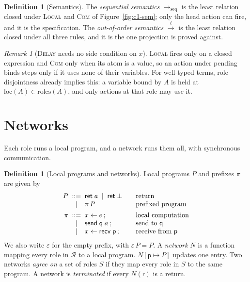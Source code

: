 \documentclass[11pt]{report}
\theoremstyle{plain}
\theoremstyle{definition}
\newtheorem{definition}[theorem]{Definition}
\theoremstyle{remark}
\newtheorem{remark}[theorem]{Remark}
\newcommand{\kw}[1]{\mathsf{#1}}
\newcommand{\pp}{\mathsf{p}}
\newcommand{\qq}{\mathsf{q}}
\newcommand{\rr}{\mathsf{r}}
\newcommand{\Roles}{\mathcal{R}}
\newcommand{\roles}[1]{\mathrm{roles}(#1)}
\newcommand{\loc}[1]{\mathrm{loc}(#1)}
\newcommand{\lto}[1]{\xrightarrow{\;#1\;}}
\newcommand{\seqto}{\to_{\mathrm{seq}}}
\newcommand{\nsend}[2]{\kw{send}\;#1\;#2}
\newcommand{\nrecv}[1]{\kw{recv}\;#1}
\newcommand{\upd}[3]{#1[#2 \mapsto #3]}
\newcommand{\rn}[1]{{\normalfont\scshape #1}}
\begin{document}
\begin{definition}[Semantics]\label{def:c1-sem}
  The \emph{sequential semantics} $\seqto$ is the least relation closed under
  \rn{Local} and \rn{Com} of Figure~\ref{fig:c1-sem}; only the head action can
  fire, and it is the specification.  The \emph{out-of-order semantics}
  $\lto{\ell}$ is the least relation closed under all three rules, and it is
  the one projection is proved against.
\end{definition}

\begin{remark}[\rn{Delay} needs no side condition on $x$]\label{rem:c1-delay}
  \rn{Local} fires only on a closed expression and \rn{Com} only when its atom
  is a value, so an action under pending binds steps only if it uses none of
  their variables.  For well-typed terms, role disjointness already implies
  this: a variable bound by $A$ is held at $\loc{A}\in\roles{A}$, and only
  actions at that role may use it.
\end{remark}

\section{Networks}
\label{sec:c1-net}

Each role runs a local program, and a network runs them all, with synchronous
communication.

\begin{definition}[Local programs and networks]\label{def:c1-net}
  Local programs $P$ and prefixes $\pi$ are given by
  \[
  \begin{array}{r@{\;\;}c@{\;\;}l@{\qquad}l}
    P & ::= & \kw{ret}\;a \;\mid\; \kw{ret}\;\bot & \text{return}\\
      & \mid & \pi\,P & \text{prefixed program}\\[1ex]
    \pi & ::= & x\leftarrow e\,; & \text{local computation}\\
      & \mid & \nsend{\qq}{a}\,; & \text{send to } \qq\\
      & \mid & x\leftarrow\nrecv{\pp}\,; & \text{receive from } \pp
  \end{array}
  \]
  We also write $\varepsilon$ for the empty prefix, with $\varepsilon\,P = P$.
  A \emph{network} $N$ is a function mapping every role in $\Roles$ to a local
  program.  $\upd{N}{\pp}{P}$ updates one entry.  Two networks \emph{agree on}
  a set of roles $S$ if they map every role in $S$ to the same program.  A
  network is \emph{terminated} if every $N(\rr)$ is a return.
\end{definition}
\end{document}
